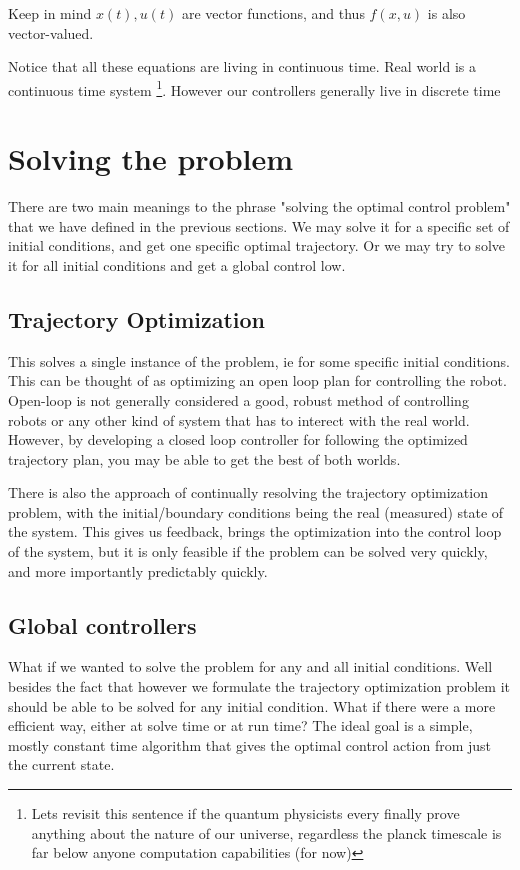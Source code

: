 \documentclass[a4paper, 10pt, twocolumn]{article}
\begin{document}
Keep in mind \(x(t), u(t)\) are vector functions, and thus \(f(x, u)\) is also vector-valued.

Notice that all these equations are living in continuous time. Real world is a continuous time system \footnote{Lets revisit this sentence if the quantum physicists every finally prove anything about the nature of our universe, regardless the planck timescale is far below anyone computation capabilities (for now)}. However our controllers generally live in discrete time

\section{Solving the problem}
There are two main meanings to the phrase "solving the optimal control problem" that we have defined in the previous sections. We may solve it for a specific set of initial conditions, and get one specific optimal trajectory. Or we may try to solve it for all initial conditions and get a global control low.
\subsection{Trajectory Optimization}

This solves a single instance of the problem, ie for some specific initial conditions. This can be thought of as optimizing an open loop plan for controlling the robot. Open-loop is not generally considered a good, robust method of controlling robots or any other kind of system that has to interect with the real world. However, by developing a closed loop controller for following the optimized trajectory plan, you may be able to get the best of both worlds.

There is also the approach of continually resolving the trajectory optimization problem, with the initial/boundary conditions being the real (measured) state of the system. This gives us feedback, brings the optimization into the control loop of the system, but it is only feasible if the problem can be solved very quickly, and more importantly predictably quickly.

\subsection{Global controllers}

What if we wanted to solve the problem for any and all initial conditions. Well besides the fact that however we formulate the trajectory optimization problem it should be able to be solved for any initial condition.
What if there were a more efficient way, either at solve time or at run time? The ideal goal is a simple, mostly constant time algorithm that gives the optimal control action from just the current state.
\end{document}
